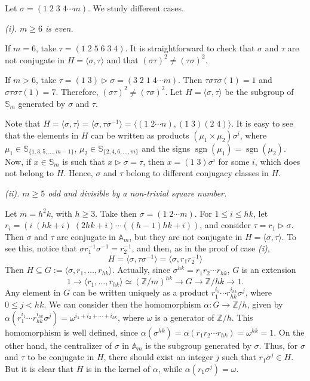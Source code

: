 \documentclass[11pt]{amsart} \textheight 22cm
\renewcommand{\^}[1]{\mbox{$^{\left( #1 \right)}$}}
\renewcommand{\_}[1]{\mbox{$_{\left( #1 \right)}$}}
\newcommand{\trid}{\triangleright}
\newcommand{\Z}{{\mathbb Z}}
\newcommand\sgn{\operatorname{sgn}}
\theoremstyle{plain}
\theoremstyle{definition}
\theoremstyle{remark}
\newcommand\A{\mathbb A}
\newcommand\s{\mathbb S}
\theoremstyle{remark}
\begin{document}
Let $\sigma=(1\;2\;3\;4\cdots m)$. We study different cases.



\medbreak \textit{(i). $m\ge 6$ is even.}

If $m=6$, take $\tau=(1\;2\;5\;6\;3\;4)$. It is straightforward to check that
    $\sigma$ and $\tau$ are not conjugate in $H = \langle\sigma,\tau\rangle$ and that
    $(\sigma\tau)^2\neq(\tau\sigma)^2$.


  If $m > 6$, take $\tau=(1\;3)\trid\sigma=(3\;2\;1\;4\cdots m)$. Then
    $\tau\sigma\tau\sigma(1)=1$ and $\sigma\tau\sigma\tau(1)=7$. Therefore, $(\sigma\tau)^2\neq(\tau\sigma)^2$.
    Let $H=\langle\sigma,\tau\rangle$ be the subgroup of $\s_m$ generated by $\sigma$ and
    $\tau$.

Note that $H=\langle\sigma,\tau\rangle=\langle\sigma,\tau\sigma^{-1}\rangle
        =\langle(1\;2\cdots n),(1\;3)(2\;4)\rangle$.
    It is easy to see that the elements in $H$ can be written as products
    $(\mu_1\times\mu_2)\sigma^i$, where $\mu_1\in\s_{\{1,3,5,\dots,m-1\}}$,
    $\mu_2\in\s_{\{2,4,6,\dots,m\}}$ and the signs $\sgn(\mu_1)=\sgn(\mu_2)$.  Now, if
    $x\in\s_m$ is such that $x\trid\sigma=\tau$, then $x=(1\;3)\sigma^i$ for some $i$, which
    does not belong to $H$. Hence, $\sigma$ and $\tau$ belong to different conjugacy classes
    in $H$.



\medbreak \textit{(ii). $m\ge 5$ odd and divisible by a
non-trivial square number.}

Let $m= h^2k$, with $h\ge 3$. Take then $\sigma=(1\;2\cdots m)$.
    For $1\le i\le hk$, let $r_i=(i\;(hk+i)\;(2hk+i)\cdots( (h-1)hk+i))$,
    and consider $\tau=r_1\trid\sigma$. Then $\sigma$ and $\tau$ are conjugate in $\A_m$, but
    they are not conjugate in $H=\langle \sigma,\tau\rangle$. To see this, notice that
    $\sigma r_1^{-1}\sigma^{-1}=r_2^{-1}$, and then, as in the proof of
    case \textit{(i)},
    \[
    H=\langle \sigma,\tau\sigma^{-1}\rangle = \langle \sigma,r_1r_2^{-1}\rangle
    \]
    Then
    $H\subseteq G:=\langle \sigma,r_1,\dots,r_{hk}\rangle$.
    Actually, since $\sigma^{hk}=r_1r_2\cdots r_{hk}$, $G$ is an extension
    \[
    1\to \langle r_1,\dots,r_{hk}\rangle\simeq (\Z/m)^{hk}
        \to G\to \Z/hk\to 1.
    \]
    Any element in $G$ can be written uniquely as a product
    $r_1^{i_1}\cdots r_{hk}^{i_{hk}}\sigma^j$, where $0\le j<hk$. We can consider then the
    homomorphism $\alpha:G\to \Z/h$, given by
    $\alpha(r_1^{i_1}\cdots r_{hk}^{i_{hk}}\sigma^j)=\omega^{i_1+i_2+\cdots+i_{hk}}$,
    where $\omega$ is a generator of $\Z/h$. This homomorphism is well defined, since
    $\alpha(\sigma^{hk})=\alpha(r_1r_2\cdots r_{hk})=\omega^{hk}=1$.  On the other hand, the
    centralizer of $\sigma$ in $\A_m$ is the subgroup generated by $\sigma$.  Thus, for
    $\sigma$ and $\tau$ to be conjugate in $H$, there should exist an integer $j$ such that
    $r_1\sigma^j\in H$. But it is clear that $H$ is in the kernel of $\alpha$, while
    $\alpha(r_1\sigma^j)=\omega$.
\end{document}
